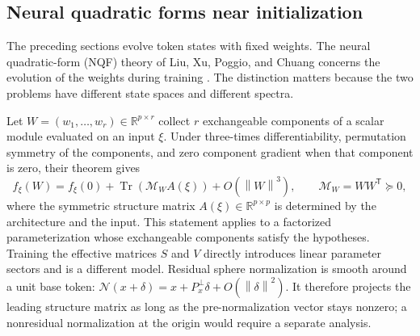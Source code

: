 \documentclass[11pt,a4paper]{article}
\theoremstyle{definition}
\newcommand{\R}{\mathbb R}
\newcommand{\T}{\mathsf T}
\newcommand{\norm}[1]{\left\lVert #1\right\rVert}
\begin{document}
\subsection{Neural quadratic forms near initialization}

The preceding sections evolve token states with fixed weights.  The neural
quadratic-form (NQF) theory of Liu, Xu, Poggio, and Chuang concerns the evolution of
the weights during training \cite{ziyin2026nqf}.  The distinction matters because the
two problems have different state spaces and different spectra.

Let $W=(w_1,\ldots,w_r)\in\R^{p\times r}$ collect $r$ exchangeable components of a
scalar module evaluated on an input $\xi$.  Under three-times differentiability,
permutation symmetry of the components, and zero component gradient when that
component is zero, their theorem gives
\begin{equation}
 f_\xi(W)=f_\xi(0)+\operatorname{Tr}\!\left(\mathcal M_W A(\xi)\right)
 +O(\norm{W}^3),\qquad
 \mathcal M_W=WW^{\T}\succeq0,
 \label{eq:nqf}
\end{equation}
where the symmetric structure matrix $A(\xi)\in\R^{p\times p}$ is determined by the
architecture and the input.  This statement applies to a factorized parameterization
whose exchangeable components satisfy the hypotheses.  Training the effective
matrices $S$ and $V$ directly introduces linear parameter sectors and is a different
model.  Residual sphere normalization is smooth around a unit base token:
$\mathcal N(x+\delta)=x+P_x^\perp\delta+O(\norm{\delta}^2)$.  It therefore projects
the leading structure matrix as long as the pre-normalization vector stays nonzero;
a nonresidual normalization at the origin would require a separate analysis.
\end{document}
